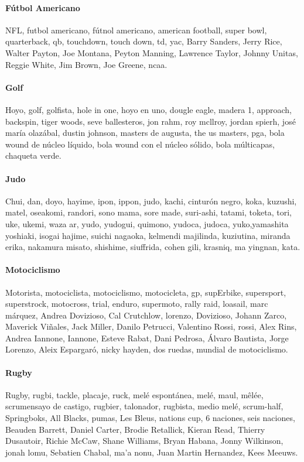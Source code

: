 \documentclass[../all.tex]{subfiles}
\begin{document}
    \paragraph{Fútbol Americano}
    NFL, futbol americano, fútnol americano, american football, super bowl, quarterback, 
    qb, touchdown, touch down, td, yac, Barry Sanders, Jerry Rice, Walter Payton, Joe Montana, Peyton Manning, Lawrence Taylor, Johnny Unitas, Reggie White, Jim Brown, Joe Greene, ncaa.
    \paragraph{Golf}
    Hoyo, golf, golfista, hole in one, hoyo en uno, dougle eagle, madera 1, approach, backspin, tiger woods, seve ballesteros, jon rahm, roy mcllroy, jordan spierh, josé maría olazábal, dustin johnson, masters de augusta, the us masters, pga, bola wound de núcleo líquido, bola wound con el núcleo sólido, bola múlticapas, chaqueta verde.
    \paragraph{Judo}
    Chui, dan, doyo, hayime, ipon, ippon, judo, kachi, cinturón negro, koka, kuzushi, matel, oseakomi, randori, sono mama, sore made, suri-ashi, tatami, toketa, tori, uke, ukemi, waza ar, yudo, yudogui, quimono, yudoca, judoca, yuko,yamashita yoshiaki, isogai hajime, suichi nagaoka, kelmendi majilinda, kuziutina, miranda erika, nakamura misato, shishime, siuffrida, cohen gili, krasniq, ma yingnan, kata.
    \paragraph{Motociclismo}
    Motorista, motociclista, motociclismo, motocicleta, gp, supErbike, supersport, superstrock, motocross, trial, enduro, supermoto, rally raid, loasail, marc márquez, Andrea Dovizioso, Cal Crutchlow, lorenzo, Dovizioso, Johann Zarco, Maverick Viñales, Jack Miller, Danilo Petrucci, Valentino Rossi, rossi, Alex Rins, Andrea Iannone, Iannone, Esteve Rabat, Dani Pedrosa, Álvaro Bautista, Jorge Lorenzo, Aleix Espargaró, nicky hayden, dos ruedas, mundial de motociclismo.
    \paragraph{Rugby}
    Rugby, rugbi, tackle, placaje, ruck, melé espontánea, melé, maul, mêlée, scrumensayo de castigo, rugbier, talonador, rugbista, medio melé, scrum-half, Springboks, All Blacks, pumas, Les Bleus, nations cup, 6 naciones, seis naciones, Beauden Barrett, Daniel Carter, Brodie Retallick, Kieran Read, Thierry Dusautoir, Richie McCaw, Shane Williams, Bryan Habana, Jonny Wilkinson, jonah lomu, Sebatien Chabal, ma'a nonu, Juan Martin Hernandez, Kees Meeuws.
\end{document}
